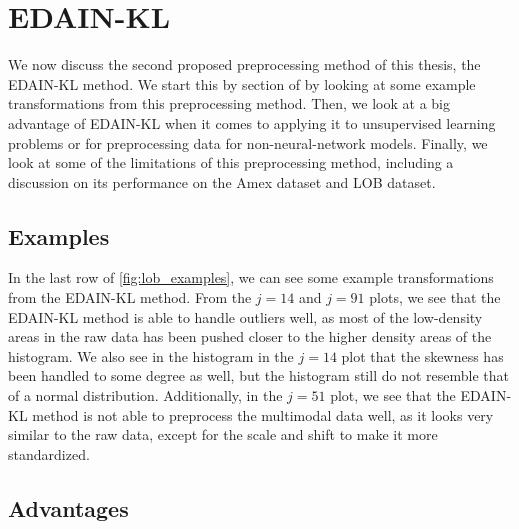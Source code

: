 \documentclass{statsmsc}
\begin{document}
{%

\section{EDAIN-KL}%
\label{sec:EDAIN-KL-discuss}


We now discuss the second proposed preprocessing method of this thesis, the \ac{EDAIN-KL} method.
We start this by section of by looking at some example transformations from this
preprocessing method. Then, we look at a big advantage of \ac{EDAIN-KL} when it comes to applying
it to unsupervised learning problems or for preprocessing data for non-neural-network models.
Finally, we look at some of the limitations of this preprocessing method, including a discussion
on its performance on the Amex dataset and \ac{LOB} dataset.

\subsection{Examples}%
\label{sub:Examples}

In the last row of \cref{fig:lob_examples}, we can see some example transformations from the
\ac{EDAIN-KL} method.
From the $j=14$ and $j=91$ plots, we see that the \ac{EDAIN-KL} method is able to handle outliers
well, as most of the low-density areas in the raw data has been pushed closer to the higher
density areas of the histogram. We also see in the histogram in the $j=14$ plot that
the skewness has been handled to some degree as well, but the histogram still do not resemble that
of a normal distribution. Additionally, in the $j=51$ plot, we see that the \ac{EDAIN-KL} method
is not able to preprocess the multimodal data well, as it looks very similar to the raw data,
except for the scale and shift to make it more standardized.

\subsection{Advantages}%
\label{sub:Advantages}

}
\end{document}
